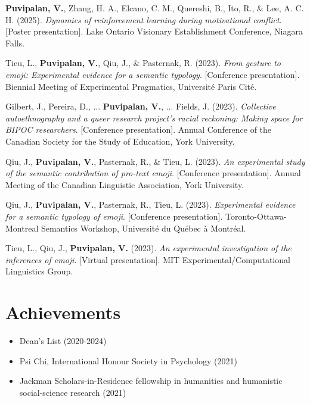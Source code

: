 \documentclass[12pt, letterpaper]{article}
\begin{document}
\begin{cvlist}

\item \textbf{Puvipalan, V.}, Zhang, H. A., Elcano, C. M., Quereshi, B., Ito, R., \& Lee, A. C. H. (2025). \textit{Dynamics of reinforcement learning during motivational conflict}. [Poster presentation]. Lake Ontario Visionary Establishment Conference, Niagara Falls.

\item  Tieu, L., \textbf{Puvipalan, V.}, Qiu, J., \& Pasternak, R. (2023). \textit{From gesture to emoji: Experimental evidence for a semantic typology}. [Conference presentation]. Biennial Meeting of Experimental Pragmatics, Université Paris Cité.

\item Gilbert, J., Pereira, D., ... \textbf{Puvipalan, V.}, ... Fields, J. (2023). \textit{Collective autoethnography and a queer research project’s racial reckoning: Making space for BIPOC researchers}. [Conference presentation]. Annual Conference of the Canadian Society for the Study of Education, York University.

\item Qiu, J., \textbf{Puvipalan, V.}, Pasternak, R., \& Tieu, L. (2023). \textit{An experimental study of the semantic contribution of pro-text emoji}. [Conference presentation]. Annual Meeting of the Canadian Linguistic Association, York University.

\item Qiu, J., \textbf{Puvipalan, V.}, Pasternak, R., Tieu, L. (2023). \textit{Experimental evidence for a semantic typology of emoji}. [Conference presentation]. Toronto-Ottawa-Montreal Semantics Workshop, Université du Québec à Montréal.

\item Tieu, L., Qiu, J., \textbf{Puvipalan, V.} (2023). \textit{An experimental investigation of the inferences of emoji}. [Virtual presentation]. MIT Experimental/Computational Linguistics Group.

\end{cvlist}

\singlespacing

\section{Achievements}
\begin{itemize}
  \item Dean's List (2020-2024)
  \item  Psi Chi, International Honour Society in Psychology (2021)
  \item Jackman Scholars-in-Residence fellowship in humanities and humanistic social-science research (2021)
\end{itemize}
\end{document}

